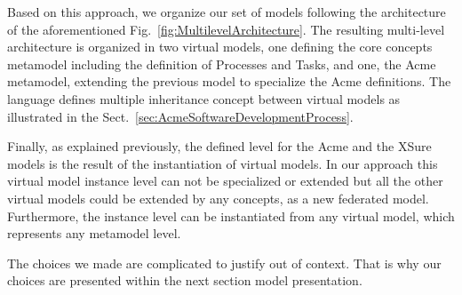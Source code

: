 
Based on this approach, we organize our set of models following the
architecture of the aforementioned Fig.~\ref{fig:MultilevelArchitecture}. The
resulting multi-level architecture is organized in two virtual models, one
defining the core concepts metamodel including the definition of Processes and
Tasks, and one, the Acme metamodel, extending the previous model to specialize
the Acme definitions. The \FML language defines multiple inheritance concept
between virtual models as illustrated in the Sect.~\ref{sec:AcmeSoftwareDevelopmentProcess}.

Finally, as explained previously, the defined level for the Acme  and the XSure models is the result of the instantiation of virtual models. In our approach this virtual model instance level can not be specialized or extended but all the other virtual models could be extended by any concepts, as a new federated model.
Furthermore, the instance level can be instantiated from any virtual model, which represents any metamodel level.




The choices we made are complicated to justify out of context. That is why our choices are presented within the next section model presentation.


